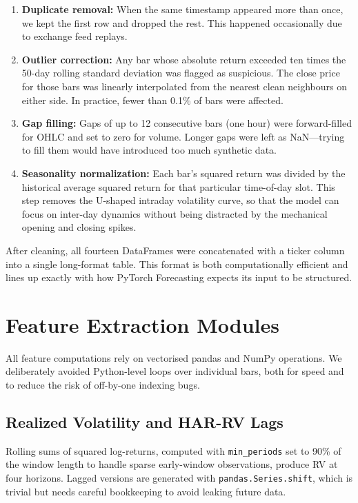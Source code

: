 \begin{enumerate}
\item \textbf{Duplicate removal:} When the same timestamp appeared more than once, we kept the first row and dropped the rest. This happened occasionally due to exchange feed replays.
\item \textbf{Outlier correction:} Any bar whose absolute return exceeded ten times the 50-day rolling standard deviation was flagged as suspicious. The close price for those bars was linearly interpolated from the nearest clean neighbours on either side. In practice, fewer than 0.1\% of bars were affected.
\item \textbf{Gap filling:} Gaps of up to 12 consecutive bars (one hour) were forward-filled for OHLC and set to zero for volume. Longer gaps were left as NaN---trying to fill them would have introduced too much synthetic data.
\item \textbf{Seasonality normalization:} Each bar's squared return was divided by the historical average squared return for that particular time-of-day slot. This step removes the U-shaped intraday volatility curve, so that the model can focus on inter-day dynamics without being distracted by the mechanical opening and closing spikes.
\end{enumerate}

After cleaning, all fourteen DataFrames were concatenated with a ticker column into a single long-format table. This format is both computationally efficient and lines up exactly with how PyTorch Forecasting expects its input to be structured.

\section{Feature Extraction Modules}

All feature computations rely on vectorised pandas and NumPy operations. We deliberately avoided Python-level loops over individual bars, both for speed and to reduce the risk of off-by-one indexing bugs.

\subsection{Realized Volatility and HAR-RV Lags}

Rolling sums of squared log-returns, computed with \texttt{min\_periods} set to 90\% of the window length to handle sparse early-window observations, produce RV at four horizons. Lagged versions are generated with \texttt{pandas.Series.shift}, which is trivial but needs careful bookkeeping to avoid leaking future data.

